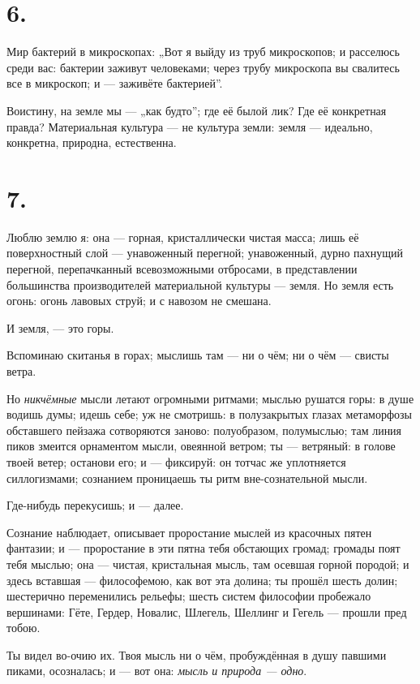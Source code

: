 \documentclass[12pt,a4paper,oneside]{book}
\begin{document}
\section*{6.}

Мир бактерий в микроскопах: „Вот я выйду из труб микроскопов; и расселюсь среди вас: бактерии заживут человеками; через трубу микроскопа вы свалитесь все в микроскоп; и — заживёте бактерией”.

Воистину, на земле мы — „как будто”; где её былой лик? Где её конкретная правда? Материальная культура — не культура земли: земля — идеально, конкретна, природна, естественна.

\section*{7.}

Люблю землю я: она — горная, кристаллически чистая масса; лишь её поверхностный слой — унавоженный перегной; унавоженный, дурно пахнущий перегной, перепачканный всевозможными отбросами, в представлении большинства производителей материальной культуры — земля. Но земля есть огонь: огонь лавовых струй; и с навозом не смешана.

И земля, — это горы.

Вспоминаю скитанья в горах; мыслишь там — ни о чём; ни о чём — свисты ветра.

Но \emph{никчёмные} мысли летают огромными ритмами; мыслью рушатся горы: в душе водишь думы; идешь себе; уж не смотришь: в полузакрытых глазах метаморфозы обставшего пейзажа сотворяются заново: полуобразом, полумыслью; там линия пиков змеится орнаментом мысли, овеянной ветром; ты — ветряный: в голове твоей ветер; останови его; и — фиксируй: он тотчас же уплотняется силлогизмами; сознанием проницаешь ты ритм вне-сознательной мысли.

Где-нибудь перекусишь; и — далее.

Сознание наблюдает, описывает проростание мыслей из красочных пятен фантазии; и — проростание в эти пятна тебя обстающих громад; громады поят тебя мыслью; она — чистая, кристальная мысль, там осевшая горной породой; и здесь вставшая — философемою, как вот эта долина; ты прошёл шесть долин; шестерично переменились рельефы; шесть систем философии пробежало вершинами: Гёте, Гердер, Новалис, Шлегель, Шеллинг и Гегель — прошли пред тобою.

Ты видел во-очию их. Твоя мысль ни о чём, пробуждённая в душу павшими пиками, осозналась; и — вот она: \emph{мысль и природа — одно}.
\end{document}
